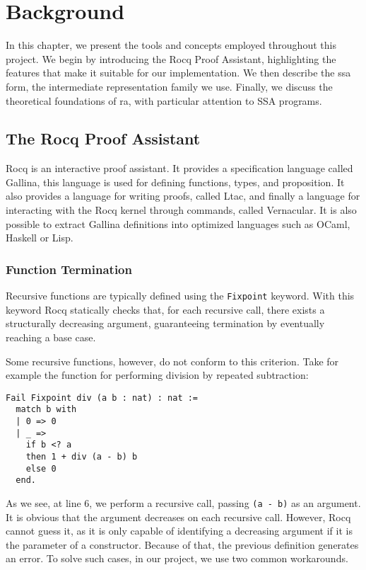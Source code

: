 
\chapter{Background}
\label{cha:background}

In this chapter, we present the tools and concepts employed throughout this project. We begin by introducing the Rocq Proof Assistant, highlighting the features that make it suitable for our implementation. We then describe the \gls{ssa} form, the intermediate representation family we use. Finally, we discuss the theoretical foundations of \gls{ra}, with particular attention to SSA programs.

\section{The Rocq Proof Assistant}

Rocq is an interactive proof assistant. It provides a specification language called Gallina, this language is used for defining functions, types, and proposition. It also provides a language for writing proofs, called Ltac, and finally a language for interacting with the Rocq kernel through commands, called Vernacular. It is also possible to extract Gallina definitions into optimized languages such as OCaml, Haskell or Lisp.

\subsection{Function Termination}
\label{subsec:funterm}

Recursive functions are typically defined using the \texttt{Fixpoint} keyword. With this keyword Rocq statically checks that, for each recursive call, there exists a structurally decreasing argument, guaranteeing termination by eventually reaching a base case.

Some recursive functions, however, do not conform to this criterion. Take for example the function for performing division by repeated subtraction:

\begin{lstlisting}[style=Rocq]
Fail Fixpoint div (a b : nat) : nat :=
  match b with
  | 0 => 0
  | _ =>
    if b <? a
    then 1 + div (a - b) b
    else 0
  end.
\end{lstlisting}

As we see, at line 6, we perform a recursive call, passing \texttt{(a - b)} as an argument. It is obvious that the argument decreases on each recursive call. However, Rocq cannot guess it, as it is only capable of identifying a decreasing argument if it is the parameter of a constructor. Because of that, the previous definition generates an error.
To solve such cases, in our project, we use two common workarounds.

